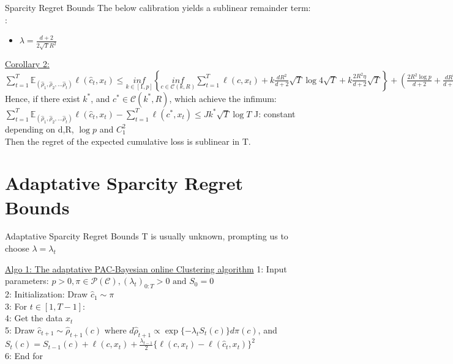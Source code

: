 \documentclass[10pt]{beamer}
\begin{document}
\begin{frame}[fragile]{Sparcity Regret Bounds}
The below calibration yields a sublinear remainder term: :\\
\begin{itemize}
\item $\lambda = \frac{d+2}{2\sqrt{T}R^{2}}$\\
\end{itemize}
\smallbreak
\begin{block}{\underline{Corollary 2:}}
$\sum_{t=1}^{T} \mathds{E}_{(\hat{\rho}_{1},\hat{\rho}_{2},...\hat{\rho}_{t})}             \ell (\hat{c}_{t}, x_{t}) \leq                                     \underset{k \in [1,p]}{inf} \left\{                                       \underset{c \in \mathscr{C}(k,R)}{inf} \sum_{t=1}^{T}  \ell (c, x_{t})   +k\frac{dR^{2}}{d+2}\sqrt{T}\log{4\sqrt{T}}+ k \frac{2R^{2}\eta}{d+2}\sqrt{T} \right\}
+ \left( \frac{2R^{2}\log{p}}{d+2} +\frac{dR^{2}}{d+2} +\frac{(d+2) C_{1}^{2}}{4R^{2}} \right) \sqrt{T}$
\smallbreak
Hence, if there exist $k^{*}$, and $c^{*} \in \mathscr{C}(k^{*}, R)$, which achieve the infimum:
$
\sum_{t=1}^{T} \mathds{E}_{(\hat{\rho}_{1},\hat{\rho}_{2},...\hat{\rho}_{t})} \ell (\hat{c}_{t}, x_{t}) - \sum_{t=1}^{T} \ell (c^{*}, x_{t}) \leq J k^{*}\sqrt{T}\log{T}
$
\smallbreak
J: constant depending on d,R, $\log{p}$ and $C_{1}^{2} $\\
Then the regret of the expected cumulative loss is sublinear in T.
\end{block}
\end{frame}



\section{Adaptative Sparcity Regret Bounds}

\begin{frame}{Adaptative Sparcity Regret Bounds}
T is usually unknown, prompting us to choose $\lambda = \lambda_{t}$
\smallbreak
\begin{block}{\underline{Algo 1: The adaptative PAC-Bayesian online Clustering algorithm}}
1: Input parameters: $p>0, \pi \in \mathscr{P}(\mathscr{C}), (\lambda_{t})_{0:T} >0 \text{ and }S_{0}=0$\\
2: Initialization: Draw $\hat{c}_{1} \sim \pi$\\
3: For $t \in [1, T-1]:$\\
4: \quad Get the data $x_{t}$\\
5: \quad Draw $\hat{c}_{t+1} \sim \hat{\rho}_{t+1}(c)$ where $d\hat{\rho}_{t+1} \propto \exp{\{ -\lambda_{t} S_{t}(c) \}}
d\pi(c)$, and \\
\hspace*{2cm} $S_{t}(c) = S_{t-1}(c) + \ell (c, x_{t}) + \frac{\lambda_{t-1}}{2}
\{ \ell(c, x_{t}) - \ell (\hat{c}_{t},  x_{t}) \}^{2}$\\
6: End for
\end{block}
\end{frame}
\end{document}
